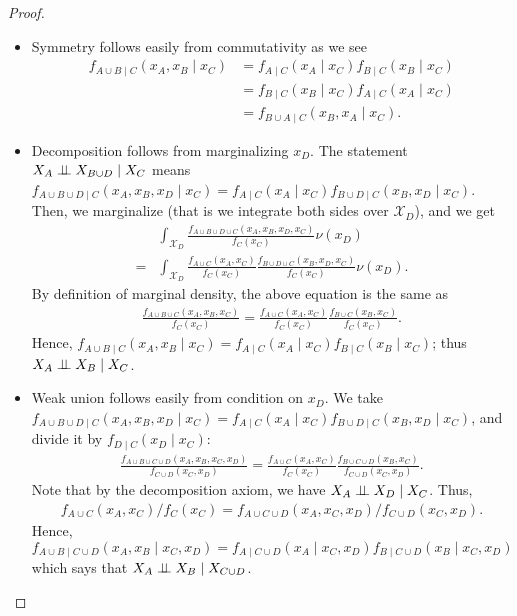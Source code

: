 \begin{proof}
\begin{itemize}
  \item Symmetry follows easily from commutativity as we see 
  \begin{align*}
    f_{A \cup B \mid C}(x_A, x_B \mid x_C) &= f_{A \mid C}(x_A \mid x_C) f_{B \mid C}(x_B \mid x_C) \\
    &=  f_{B \mid C}(x_B \mid x_C) f_{A \mid C}(x_A \mid x_C) \\
    &= f_{B \cup A \mid C}(x_B, x_A \mid x_C).
  \end{align*}

  \item Decomposition follows from marginalizing \( x_D \). The statement \( X_A \perp \!\!\! \perp X_{B \cup D} \mid X_C \) means \(  f_{A \cup B \cup D \mid C}(x_A,x_B,x_D \mid x_C) = f_{A \mid C}(x_A \mid x_C) f_{B \cup D \mid C}(x_B, x_D \mid x_C) \). Then, we marginalize (that is we integrate both sides over \( \mathcal{X}_D \)), and we get 
  \begin{align*}
    &\int_{\mathcal{X}_D} \frac{f_{A \cup B \cup D \cup C}(x_A, x_B, x_D, x_C)}{f_{C}(x_C)} \nu(x_D) \\ = &\int_{\mathcal{X}_D} \frac{f_{A \cup C}(x_A, x_C)}{f_{C}(x_C)}  \frac{f_{B \cup D \cup C}(x_B, x_D, x_C)}{f_{C}(x_C)} \nu(x_D).
  \end{align*}
  By definition of marginal density, the above equation is the same as 
  \begin{align*}
    \frac{f_{A \cup B \cup C}(x_A,x_B,x_C)}{f_{C}(x_C)} = \frac{f_{A \cup C}(x_A, x_C)}{f_C(x_C)}\frac{f_{B \cup C}(x_B, x_C)}{f_C(x_C)}.
  \end{align*}
  Hence, \( f_{A \cup B \mid C}(x_A, x_B \mid x_C) = f_{A \mid C}(x_A \mid x_C) f_{B \mid C}(x_B \mid x_C) \); thus \( X_A \perp \!\!\! \perp X_B \mid X_C \).

  \item Weak union follows easily from condition on \( x_D \). We take \(  f_{A \cup B \cup D \mid C}(x_A,x_B,x_D \mid x_C) = f_{A \mid C}(x_A \mid x_C) f_{B \cup D \mid C}(x_B, x_D \mid x_C) \), and divide it by \( f_{D \mid C}(x_D \mid x_C) \):
  \begin{align*}
    \frac{f_{A \cup B \cup C \cup D}(x_A,x_B,x_C,x_D)}{f_{C \cup D}(x_C, x_D)} = \frac{f_{A \cup C}(x_A,x_C)}{f_{C}(x_C)}\frac{f_{B \cup C \cup D}(x_B,x_C)}{f_{C \cup D}(x_C,x_D)}.
  \end{align*}
  Note that by the decomposition axiom, we have \( X_A \perp \!\!\! \perp X_D \mid X_C \). Thus,
  \begin{align*}
    f_{A \cup C}(x_A,x_C) / f_C(x_C) = f_{A \cup C \cup D}(x_A,x_C,x_D) / f_{C \cup D}(x_C,x_D).
  \end{align*}  
  Hence, \( f_{A \cup B \mid C \cup D}(x_A, x_B \mid x_C, x_D) = f_{A \mid C \cup D}(x_A \mid x_C, x_D) f_{B \mid C \cup D}(x_B \mid x_C, x_D) \) which says that \( X_A \perp \!\!\! \perp X_B \mid X_{C \cup D} \).


\end{itemize}
\end{proof}
